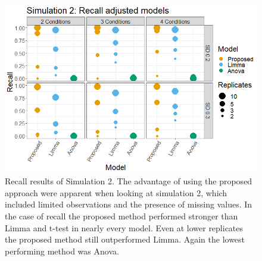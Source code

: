 \documentclass{mcp}
\begin{document}
\begin{figure}[h!]
\centering
	\includegraphics[width=.8\textwidth]{sim_new/sim3_Recall}
	\caption{}
\caption{Recall results of Simulation 2. The advantage of using the proposed approach were apparent when looking at simulation 2, which included limited observations and the presence of missing values. In the case of recall the proposed method performed stronger than Limma and t-test in nearly every model. Even at lower replicates the proposed method still outperformed Limma. Again the lowest performing method was Anova.}
\label{fig:sim2_recall}
\end{figure}
\end{document}
